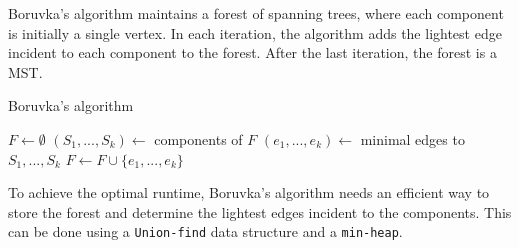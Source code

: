 \documentclass[a3paper, landscape, 11pt]{article} %
\begin{document}
\begin{multicols*}{4}
 Boruvka's algorithm maintains a forest of spanning trees, where each component is initially a single vertex. In each iteration, the algorithm adds the lightest edge incident to each component to the forest. After the last iteration, the forest is a MST.

\begin{algorithm}[H]
\caption{Boruvka's algorithm}
\begin{algorithmic}[1]
\State $F \gets \emptyset$  
	\State $(S_1,...,S_k) \gets$ components of $F$
	\State $(e_1,...,e_k) \gets$ minimal edges to $S_1,...,S_k$
	\State $F \gets F \cup \{e_1,...,e_k\}$
\EndWhile
\EndProcedure
\end{algorithmic}
\end{algorithm}

To achieve the optimal runtime, Boruvka's algorithm needs an efficient way to store the forest and determine the lightest edges incident to the components. This can be done using a \texttt{Union-find} data structure and a \texttt{min-heap}.

\vfill %


\end{multicols*}
\end{document}
